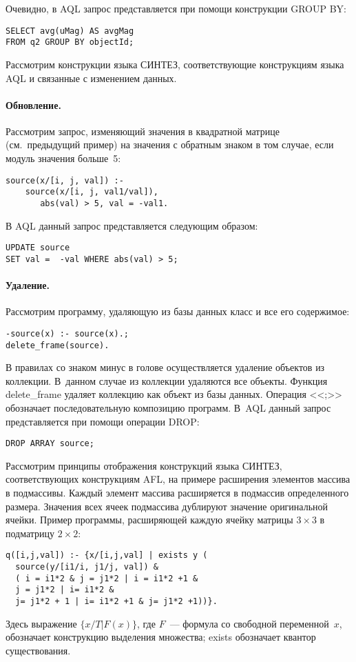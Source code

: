 \begin{multicols}{2}
        Очевидно, в AQL запрос представляется при помощи конструкции 
GROUP BY:
        \begin{verbatim}
SELECT avg(uMag) AS avgMag
FROM q2 GROUP BY objectId;
\end{verbatim}
        
        Рассмотрим конструкции языка СИНТЕЗ, соответствующие 
конструкциям языка AQL и связанные с {изменением} данных.

        
\paragraph*{Обновление.} Рассмотрим запрос, изменяющий значения в 
квадратной матрице (см.\ предыдущий пример) на значения с обратным знаком 
в том случае, если модуль значения больше~5:
        \begin{verbatim}
source(x/[i, j, val]) :- 
    source(x/[i, j, val1/val]), 
       abs(val) > 5, val = -val1.
\end{verbatim}
        
        В AQL данный запрос представляется сле\-ду\-ющим образом:
        \begin{verbatim}
UPDATE source
SET val =  -val WHERE abs(val) > 5;
\end{verbatim}


        
\paragraph*{Удаление.} Рассмотрим программу, удаляющую из базы данных 
класс и все его содержимое:
        \begin{verbatim}
-source(x) :- source(x).; 
delete_frame(source).
\end{verbatim}

        В правилах со знаком минус в голове осуществляется удаление объектов 
из коллекции. В~данном случае из коллекции удаляются все объекты. Функция 
{\sf delete\_frame} удаляет коллекцию как объект из базы данных. Операция <<{\sf ;}>> 
обозначает последовательную композицию программ. В~AQL данный запрос 
представляется при помощи операции {\sf DROP}:
\begin{verbatim}
DROP ARRAY source;
\end{verbatim}

        Рассмотрим принципы отображения конструкций языка СИНТЕЗ, 
соответствующих конструкциям AFL, на примере {расширения элементов 
мас\-си\-ва в подмассивы}. Каждый элемент массива расширя\-ется в подмассив 
определенного размера. Значения всех ячеек подмассива дублируют значение 
оригинальной ячейки. Пример программы, расширяющей каждую ячейку 
матрицы $3\times3$ в подматрицу $2\times2$:
        \begin{verbatim}
q([i,j,val]) :- {x/[i,j,val] | exists y (
  source(y/[i1/i, j1/j, val]) & 
  ( i = i1*2 & j = j1*2 | i = i1*2 +1 & 
  j = j1*2 | i= i1*2 & 
  j= j1*2 + 1 | i= i1*2 +1 & j= j1*2 +1))}.
\end{verbatim}
    Здесь выражение $\{x/T \vert F(x)\}$, где $F$~--- формула со свободной 
переменной~$x$, обозначает конструкцию выделения множества; {\sf exists} 
обозначает квантор существования. 


\end{multicols}
